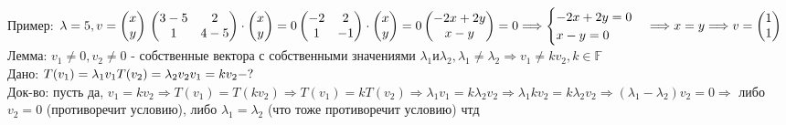 \documentclass[12pt, oneside]{book}
\theoremstyle{definition}
\begin{document}
\begin{enumerate}
Пример: $\lambda = 5, v = \begin{pmatrix}
 x\\
 y\\
\end{pmatrix}\\
\begin{pmatrix}
 3 - 5 & 2\\
 1 & 4 - 5 
\end{pmatrix} \cdot \begin{pmatrix}
 x\\
 y\\
\end{pmatrix} = 0 \\
\begin{pmatrix}
-2 & 2\\
 1 & -1
\end{pmatrix} \cdot \begin{pmatrix}
 x\\
 y\\
\end{pmatrix} = 0 \\
\begin{pmatrix}
  -2x + 2y\\
  x-y
\end{pmatrix} = 0 \Longrightarrow \begin{cases}
-2x + 2y = 0  \\
x - y = 0
\end{cases} \Longrightarrow x = y \Longrightarrow v = \begin{pmatrix}
 1\\
 1\\
\end{pmatrix}$\\
Лемма: $v_1 \neq 0, v_2 \neq 0$ - собственные вектора с собственными значениями ${\lambda}_1 и {\lambda}_2, {\lambda}_1 \neq {\lambda}_2 \Longrightarrow v_1 \neq k v_2, k\in \mathbb{F}$\\
Дано: $T(v_1) = {\lambda}_1 v_1 \\
T(v_2) = {\lambda}_2 v_2\\
v_1 = k v_2 -?$\\
Док-во: пусть да, $v_1 = k v_2 \Longrightarrow T(v_1) = T(kv_2) \Longrightarrow T(v_1) = k T(v_2) \Longrightarrow {\lambda}_1 v_1 = k {\lambda}_2 v_2 \Longrightarrow {\lambda}_1 k v_2 = k {\lambda}_2 v_2 \Longrightarrow ({\lambda}_1 - {\lambda}_2) v_2 = 0 \Longrightarrow$ либо $v_2 = 0$ (противоречит условию), либо ${\lambda}_1 = {\lambda}_2$ (что тоже противоречит условию) чтд


\end{enumerate}
\end{document}
